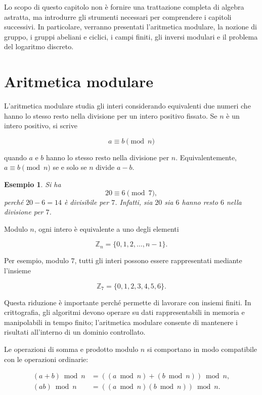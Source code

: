\documentclass[12pt,a4paper,oneside]{report}
\newtheorem{example}{Esempio}[chapter]
\begin{document}
Lo scopo di questo capitolo non è fornire una trattazione completa di algebra astratta, ma introdurre gli strumenti necessari per comprendere i capitoli successivi. In particolare, verranno presentati l'aritmetica modulare, la nozione di gruppo, i gruppi abeliani e ciclici, i campi finiti, gli inversi modulari e il problema del logaritmo discreto.

\section{Aritmetica modulare}

L'aritmetica modulare studia gli interi considerando equivalenti due numeri che hanno lo stesso resto nella divisione per un intero positivo fissato. Se \(n\) è un intero positivo, si scrive

\begin{equation}
    a \equiv b \pmod n
\end{equation}

quando \(a\) e \(b\) hanno lo stesso resto nella divisione per \(n\). Equivalentemente, \(a \equiv b \pmod n\) se e solo se \(n\) divide \(a-b\).

\begin{example}
Si ha
\[
20 \equiv 6 \pmod 7,
\]
perché \(20-6=14\) è divisibile per \(7\). Infatti, sia \(20\) sia \(6\) hanno resto \(6\) nella divisione per \(7\).
\end{example}

Modulo \(n\), ogni intero è equivalente a uno degli elementi

\[
\mathbb{Z}_n = \{0,1,2,\ldots,n-1\}.
\]

Per esempio, modulo \(7\), tutti gli interi possono essere rappresentati mediante l'insieme

\[
\mathbb{Z}_7 = \{0,1,2,3,4,5,6\}.
\]

Questa riduzione è importante perché permette di lavorare con insiemi finiti. In crittografia, gli algoritmi devono operare su dati rappresentabili in memoria e manipolabili in tempo finito; l'aritmetica modulare consente di mantenere i risultati all'interno di un dominio controllato.

Le operazioni di somma e prodotto modulo \(n\) si comportano in modo compatibile con le operazioni ordinarie:

\begin{align}
    (a+b) \bmod n &= ((a \bmod n)+(b \bmod n)) \bmod n, \\
    (ab) \bmod n &= ((a \bmod n)(b \bmod n)) \bmod n.
\end{align}
\end{document}
